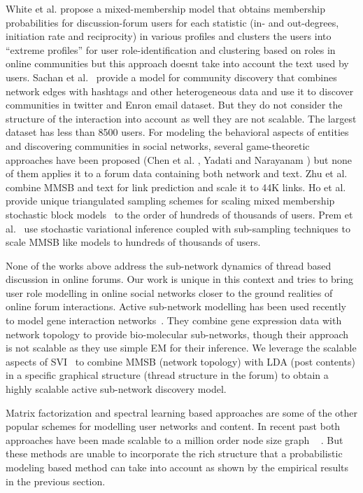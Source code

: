 \documentclass{sig-alternate}
\begin{document}
White et al.\cite{ICWSM124638} propose a mixed-membership model that obtains
membership probabilities for discussion-forum users for each statistic
(in- and out-degrees, initiation rate and reciprocity) in various profiles and
clusters the users into ``extreme profiles'' for user role-identification
and clustering based on roles in online communities but this approach
doesnt take into account the text used by users.
Sachan et
al.~\cite{Sachan:2012:UCI:2187836.2187882} provide a model for community
discovery that combines network edges with hashtags and other heterogeneous data
and use it to discover communities in twitter and Enron email dataset. But they
do not consider the structure of the interaction into account as well they are 
not scalable. The largest dataset has less than 8500 users.
For modeling the behavioral aspects of entities and
discovering communities in social networks, several game-theoretic approaches
have been proposed (Chen et al. \cite{Chen:2010:GFI:1842547.1842566}, Yadati and
Narayanam \cite{Yadati:2011:GTM:1963192.1963316}) but none of them applies it to
a forum data containing both network and text. Zhu et
al.~\cite{Zhu:getoor:MMSB-text} combine MMSB and text for link prediction and
scale it to 44K links.
Ho et al.~\cite{HoYX12} provide  unique triangulated sampling schemes for scaling
mixed membership stochastic block models~\cite{Airoldi:2008:MMS:1390681.1442798} to
the order of hundreds of thousands of users. Prem et
al.~\cite{conf/nips/GopalanMGFB12} use stochastic variational inference 
coupled with sub-sampling techniques to
scale MMSB like models to hundreds of thousands of users.


None of the works above address the sub-network dynamics of thread based
discussion in online forums. Our work is unique in this context and tries to
bring user role modelling in online social networks closer to the
ground realities of online forum interactions.
Active sub-network modelling has been used recently to model gene interaction 
networks~\cite{Lichtenstein:Charleston}. They
combine gene expression data with network topology to provide bio-molecular 
sub-networks, though their approach is not scalable as they use simple EM for
their inference. We leverage the scalable aspects of
SVI~\cite{Hoffman:2013:SVI} to combine MMSB (network topology) with LDA (post
contents) in a specific graphical structure (thread structure in the forum) to
obtain a highly scalable active sub-network discovery model.

Matrix factorization and spectral learning based approaches are some of the
other popular schemes for modelling user networks and content. In recent
past both approaches have been made scalable to a million order node size graph
~ \cite{Gemulla:2011:LMF,Dhillon:2005}. But these methods are unable to incorporate 
the rich structure that a probabilistic modeling based method 
can take into account as shown by the empirical results in the 
previous section.
\end{document}
